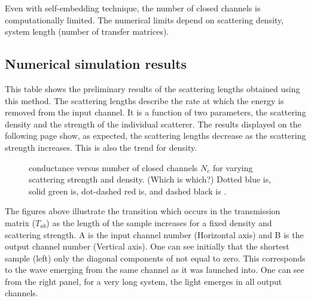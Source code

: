 Even with self-embedding technique, the number of closed channels is computationally limited.
The numerical limits depend on scattering density, system length (number of transfer matrices).

\subsection {Numerical simulation results}
%

This table shows the preliminary results of the scattering lengths
obtained using this method.  The scattering lengths describe the rate at which
the energy is removed from the input channel.  It is a function of two
parameters, the scattering density and the strength of the individual
scatterer.  The results displayed on the following page show, as expected,
the scattering lengths decrease as the scattering strength increases.  This is
also the trend for density.

\begin{figure}
\vskip -0.5cm
\centerline{
}
\vskip -0.5cm
\caption{conductance versus number of closed channels $N_c$ for varying
scattering strength and density. (Which is which?) Dotted blue is, solid
green is, dot-dashed red is, and dashed black is .}
\label{fig:gVersusNc}
\end{figure}

The figures above illustrate the transition which occurs in the transmission
matrix ($T_{ab}$) as the length of the sample increases for a fixed density and
scattering strength.  A is the input channel number (Horizontal axis) and B is
the output channel number (Vertical axis).  One can see initially that the
shortest sample (left) only the diagonal components of not equal to zero.
This corresponds to the wave emerging from the same channel as it was launched
into.  One can see from the right panel, for a very long system, the light
emerges in all output channels.

